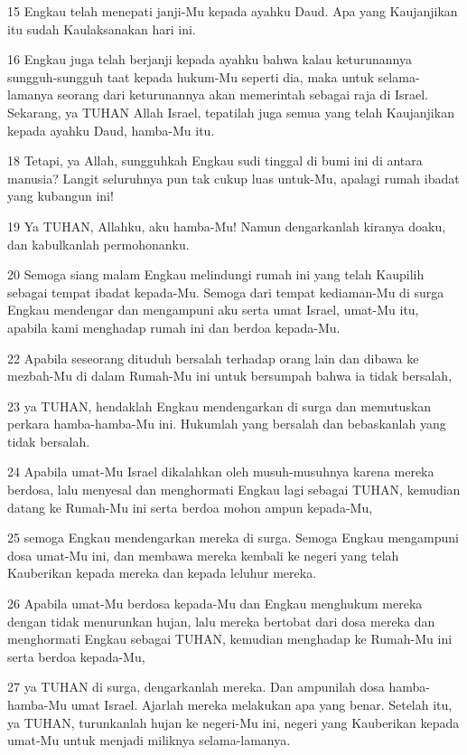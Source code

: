 \par 15 Engkau telah menepati janji-Mu kepada ayahku Daud. Apa yang Kaujanjikan itu sudah Kaulaksanakan hari ini.
\par 16 Engkau juga telah berjanji kepada ayahku bahwa kalau keturunannya sungguh-sungguh taat kepada hukum-Mu seperti dia, maka untuk selama-lamanya seorang dari keturunannya akan memerintah sebagai raja di Israel. Sekarang, ya TUHAN Allah Israel, tepatilah juga semua yang telah Kaujanjikan kepada ayahku Daud, hamba-Mu itu.
\par 18 Tetapi, ya Allah, sungguhkah Engkau sudi tinggal di bumi ini di antara manusia? Langit seluruhnya pun tak cukup luas untuk-Mu, apalagi rumah ibadat yang kubangun ini!
\par 19 Ya TUHAN, Allahku, aku hamba-Mu! Namun dengarkanlah kiranya doaku, dan kabulkanlah permohonanku.
\par 20 Semoga siang malam Engkau melindungi rumah ini yang telah Kaupilih sebagai tempat ibadat kepada-Mu. Semoga dari tempat kediaman-Mu di surga Engkau mendengar dan mengampuni aku serta umat Israel, umat-Mu itu, apabila kami menghadap rumah ini dan berdoa kepada-Mu.
\par 22 Apabila seseorang dituduh bersalah terhadap orang lain dan dibawa ke mezbah-Mu di dalam Rumah-Mu ini untuk bersumpah bahwa ia tidak bersalah,
\par 23 ya TUHAN, hendaklah Engkau mendengarkan di surga dan memutuskan perkara hamba-hamba-Mu ini. Hukumlah yang bersalah dan bebaskanlah yang tidak bersalah.
\par 24 Apabila umat-Mu Israel dikalahkan oleh musuh-musuhnya karena mereka berdosa, lalu menyesal dan menghormati Engkau lagi sebagai TUHAN, kemudian datang ke Rumah-Mu ini serta berdoa mohon ampun kepada-Mu,
\par 25 semoga Engkau mendengarkan mereka di surga. Semoga Engkau mengampuni dosa umat-Mu ini, dan membawa mereka kembali ke negeri yang telah Kauberikan kepada mereka dan kepada leluhur mereka.
\par 26 Apabila umat-Mu berdosa kepada-Mu dan Engkau menghukum mereka dengan tidak menurunkan hujan, lalu mereka bertobat dari dosa mereka dan menghormati Engkau sebagai TUHAN, kemudian menghadap ke Rumah-Mu ini serta berdoa kepada-Mu,
\par 27 ya TUHAN di surga, dengarkanlah mereka. Dan ampunilah dosa hamba-hamba-Mu umat Israel. Ajarlah mereka melakukan apa yang benar. Setelah itu, ya TUHAN, turunkanlah hujan ke negeri-Mu ini, negeri yang Kauberikan kepada umat-Mu untuk menjadi miliknya selama-lamanya.
